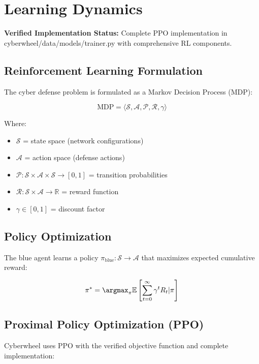\documentclass[12pt,a4paper]{article}
\begin{document}
\section{Learning Dynamics}

\textbf{Verified Implementation Status:} Complete PPO implementation in cyberwheel/data/models/trainer.py with comprehensive RL components.

\subsection{Reinforcement Learning Formulation}
The cyber defense problem is formulated as a Markov Decision Process (MDP):

\begin{equation}
\text{MDP} = \langle \mathcal{S}, \mathcal{A}, \mathcal{P}, \mathcal{R}, \gamma \rangle
\end{equation}

Where:
\begin{itemize}
    \item $\mathcal{S}$ = state space (network configurations)
    \item $\mathcal{A}$ = action space (defense actions)
    \item $\mathcal{P}: \mathcal{S} \times \mathcal{A} \times \mathcal{S} \rightarrow [0,1]$ = transition probabilities
    \item $\mathcal{R}: \mathcal{S} \times \mathcal{A} \rightarrow \mathbb{R}$ = reward function
    \item $\gamma \in [0,1]$ = discount factor
\end{itemize}

\subsection{Policy Optimization}
The blue agent learns a policy $\pi_{\text{blue}}: \mathcal{S} \rightarrow \mathcal{A}$ that maximizes expected cumulative reward:

\begin{equation}
\pi^* = \argmax_\pi \mathbb{E}\left[\sum_{t=0}^{\infty} \gamma^t R_t | \pi\right]
\end{equation}

\subsection{Proximal Policy Optimization (PPO)}
Cyberwheel uses PPO with the verified objective function and complete implementation:
\end{document}
